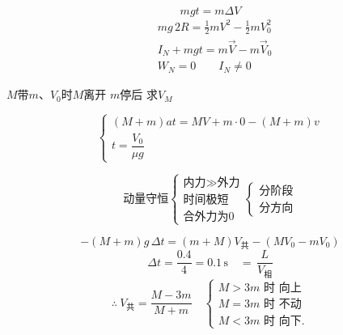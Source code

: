 \[
mgt=m\Delta V
\]
\begin{align*}
&mg\,2R=\tfrac12 mV^2-\tfrac12 mV_0^2\\
&I_N+mgt=m\vec V-m\vec V_0\\
&W_N=0\qquad I_N\ne0
\end{align*}
\begin{problem}
$M$带$m$、$V_0$时$M$离开 $m$停后 求$V_M$
\begin{solution}
\[
\begin{cases}
(M+m)at=MV+m\cdot0-(M+m)v\\[2pt]
t=\dfrac{V_0}{\mu g}
\end{cases}
\]
\end{solution}
\end{problem}
\[
\text{动量守恒}
\left\{
\begin{array}{l}
\text{内力}\gg\text{外力}\\
\text{时间极短}\\
\text{合外力为0}
\end{array}
\right.
\left\{
\begin{array}{l}
\text{分阶段}\\
\text{分方向}
\end{array}
\right.
\]
\begin{problem}
\begin{solution}
\[
-(M+m)g\,\Delta t=(m+M)V_{\text{共}}-(MV_0-mV_0)
\]
\[
\Delta t=\dfrac{0.4}{4}=0.1\,\mathrm{s}\quad {=}\,\dfrac{L}{V_{\text{相}}}
\]
\[
\therefore\ V_{\text{共}}=\dfrac{M-3m}{M+m}\quad
\begin{cases}
M>3m\text{ 时 向上}\\
M=3m\text{ 时 不动}\\
M<3m\text{ 时 向下.}
\end{cases}
\]
\end{solution}
\end{problem}
